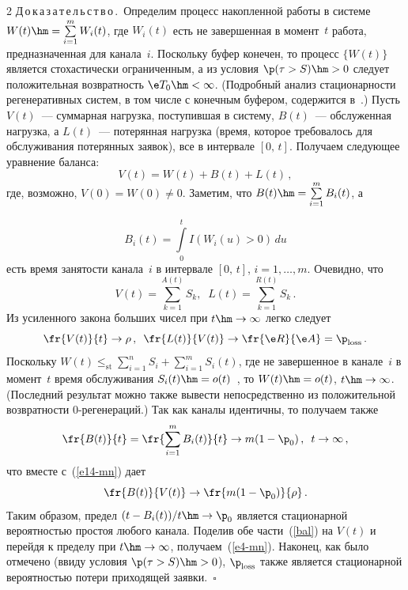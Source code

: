 \begin{multicols}{2}
\noindent
Д\,о\,к\,а\,з\,а\,т\,е\,л\,ь\,с\,т\,в\,о\,.\
Определим процесс накопленной работы в сис\-те\-ме
$W(t)\hm=\sum\limits_{i=1}^mW_i(t)$, где $W_i(t)$ есть не завершенная  в момент~$t$ 
работа, предназначенная для   канала~$i$. Поскольку буфер
конечен, то процесс $\{W(t)\}$  является стохастически ограниченным, 
а из условия $\p(\tau>S)\hm>0$ следует  положительная возвратность
 $\e T_0\hm<\infty$.  (Подробный анализ стационарности регенеративных сис\-тем, 
 в том числе с конечным буфером, содержится в~\cite{Morozov2004, MorozovDelgado}.) 
 Пусть  $V(t)$~--- суммарная нагрузка, поступившая в сис\-те\-му, 
 $B(t)$~--- обслуженная нагрузка, а $L(t)$~--- потерянная нагрузка (время, которое требовалось для обслуживания
потерянных заявок), все в интервале $[0,\,t]$. Получаем следующее уравнение баланса:
\begin{equation}
 V(t)=W(t)+B(t)+L(t)\,,
 \label{bal}
\end{equation} 
где, возможно, $V(0)=W(0)\not =0$. Заметим, что $B(t)\hm=\sum\limits_{i=1}^mB_i(t)$, а 

\noindent
$$
B_i(t)=\int\limits_0^tI(W_i(u)>0)\,du 
$$ есть время занятости канала~$i$ в интервале $[0,\,t]$, $i=1,\ldots,m$. Очевидно,  что
\begin{equation}
V(t)=\sum_{k=1}^{A(t)}S_k,\;\; L(t)=\sum\limits_{k=1}^{R(t)}S_k\,.
\label{e11-mn}
\end{equation}
Из  усиленного закона больших чисел при $t\hm\to\infty$  легко следует
\begin{equation}
\fr{V(t)}{t}\to \rho\,,\enskip \fr{L(t)}{V(t)} \to
\fr{\e R}{\e A}= \p_{\mathrm{loss}}\,.
\label{e14-mn}
 \end{equation} 
 Поскольку
$W(t)\le_{\!\mathrm{st}}\sum\limits_{i=1}^nS_i+\sum\limits_{i=1}^mS_i(t)$, 
где не завершенное в канале~$i$ в момент~$t$ время обслуживания 
$S_i(t)\hm=o(t)$~\cite{Smith}, то $W(t)\hm=o(t)$, $t\hm\to \infty$. (Последний результат
можно также вывести непосредственно из положительной возвратности
$0$-ре\-ге\-не\-ра\-ций.) Так как каналы идентичны, то получаем также
\begin{equation}
\fr{B(t)}{t}=\fr{\sum\limits_{i=1}^mB_i(t)}{t}\to m(1-\p_0)\,,\enskip t\to \infty\,,
\label{e16-mn}
 \end{equation}
  что  вместе с~(\ref{e14-mn}) дает
 \begin{equation*}
\fr{B(t)}{V(t)}\to \fr{m(1-\p_0)}{\rho}\,.
\end{equation*} 
Таким образом, предел $(t-B_i(t))/t\hm\to \p_0$ является стационарной вероятностью простоя любого
канала. Поделив обе части~(\ref{bal}) на $V(t)$ и перейдя к пределу при $t\hm\to\infty$, 
получаем~(\ref{e4-mn}). Наконец, как было отмечено (ввиду  условия
$\p(\tau>S)\hm>0$),  $\p_{\mathrm{loss}}$ также  является стационарной вероятностью потери приходящей 
заявки.~\hfill$\square$


\end{multicols}
